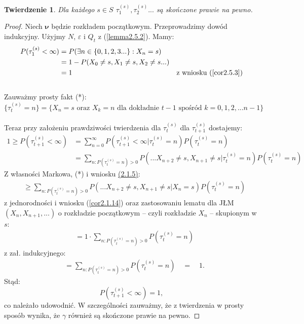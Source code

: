 \documentclass[a4paper]{article}
\theoremstyle{defn}
\theoremstyle{theorem}
\newtheorem{theorem}[defn]{Twierdzenie}
\theoremstyle{lemma}
\theoremstyle{cor}
\theoremstyle{fact}
\begin{document}
\begin{theorem}\label{theorem2.5.4}
Dla każdego $s\in S$ $\tau_1^{(s)}, \tau_2^{(s)}...$ są skończone prawie na pewno.
\end{theorem}
\begin{proof}
Niech $\boldsymbol{\nu}$ będzie rozkładem początkowym. Przeprowadzimy dowód indukcyjny. Użyjmy $N$, $\varepsilon$ i $Q_t$ z (\ref{lemma2.5.2}). Mamy:
\begin{align*}
P(\tau_1^{(s)}< \infty) &= P(\exists n \in \{0,1,2,3...\}: X_n = s) \\
&= 1 - P(X_0 \neq s, X_{1} \neq s, X_2 \neq s ...) \\
&= 1 & \text{z wniosku (\ref{cor2.5.3})}
\end{align*}
\\
Zauważmy prosty fakt (*):
$$\{\tau_t^{(s)} = n\} = \{X_n = s \,\,\text{oraz}\,\, X_k = n \,\, \text{dla dokładnie}\,\, t-1\,\, \text{spośród}\,\, k = 0,1,2,...n-1\}$$
\\
Teraz przy założeniu prawdziwości twierdzenia dla $\tau_{t}^{(s)}$ dla $\tau_{t+1}^{(s)}$ dostajemy: \\
\begin{align*}
1 \geq P(\tau_{t+1}^{(s)} < \infty) &= \sum_{n = 0}^{\infty} P(\tau_{t+1}^{(s)} < \infty| \tau_{t}^{(s)} = n)P(\tau_{t}^{(s)} = n)\\
&= \sum_{n: P(\tau_{t}^{(s)} = n) > 0} P(... X_{n+2} \neq s, X_{n+1} \neq s| \tau_{t}^{(s)} = n) P(\tau_{t}^{(s)} = n)
\end{align*}
Z własności Markowa, (*) i wniosku \hyperref[cor2.1.5]{(2.1.5)}:
\begin{align*}
&\geq \sum_{n: P(\tau_{t}^{(s)} = n) > 0} P(... X_{n+2} \neq s, X_{n+1} \neq s |X_n = s) P(\tau_{t}^{(s)} = n)
\end{align*}
z jednorodności i wniosku (\ref{cor2.1.14}) oraz zastosowaniu lematu dla JŁM $(X_n, X_{n+1}, ...)$ o rozkładzie początkowym – czyli rozkładzie $X_n$ – skupionym w $s$:
\begin{align*}
&= 1 \cdot \sum_{n: P(\tau_{t}^{(s)} = n) > 0} P(\tau_{t}^{(s)} = n)
\end{align*}
z zał. indukcyjnego:
\begin{align*}
&= \sum_{n: P(\tau_{t}^{(s)} = n) > 0} P(\tau_{t}^{(s)} = n) \quad = \quad 1.
\end{align*}
Stąd:
$$P(\tau_{t+1}^{(s)} < \infty) = 1,$$
co należało udowodnić. W szczególności zauważmy, że z twierdzenia w prosty sposób wynika, że $\gamma$ również są skończone prawie na pewno.
\end{proof}
\end{document}
